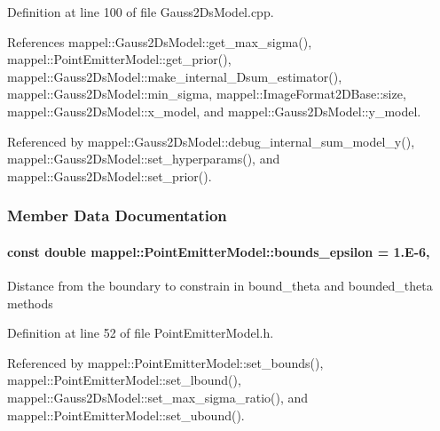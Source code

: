 Definition at line 100 of file Gauss2\+Ds\+Model.\+cpp.



References mappel\+::\+Gauss2\+Ds\+Model\+::get\+\_\+max\+\_\+sigma(), mappel\+::\+Point\+Emitter\+Model\+::get\+\_\+prior(), mappel\+::\+Gauss2\+Ds\+Model\+::make\+\_\+internal\+\_\+Dsum\+\_\+estimator(), mappel\+::\+Gauss2\+Ds\+Model\+::min\+\_\+sigma, mappel\+::\+Image\+Format2\+D\+Base\+::size, mappel\+::\+Gauss2\+Ds\+Model\+::x\+\_\+model, and mappel\+::\+Gauss2\+Ds\+Model\+::y\+\_\+model.



Referenced by mappel\+::\+Gauss2\+Ds\+Model\+::debug\+\_\+internal\+\_\+sum\+\_\+model\+\_\+y(), mappel\+::\+Gauss2\+Ds\+Model\+::set\+\_\+hyperparams(), and mappel\+::\+Gauss2\+Ds\+Model\+::set\+\_\+prior().



\subsubsection{Member Data Documentation}
\paragraph[{\texorpdfstring{bounds\+\_\+epsilon}{bounds_epsilon}}]{\setlength{\rightskip}{0pt plus 5cm}const double mappel\+::\+Point\+Emitter\+Model\+::bounds\+\_\+epsilon = 1.\+E-\/6\hspace{0.3cm}{\ttfamily [static]}, {\ttfamily [inherited]}}\hypertarget{classmappel_1_1PointEmitterModel_ac987a119137b85a27704b1c40e3fab8c}{}\label{classmappel_1_1PointEmitterModel_ac987a119137b85a27704b1c40e3fab8c}
Distance from the boundary to constrain in bound\+\_\+theta and bounded\+\_\+theta methods 

Definition at line 52 of file Point\+Emitter\+Model.\+h.



Referenced by mappel\+::\+Point\+Emitter\+Model\+::set\+\_\+bounds(), mappel\+::\+Point\+Emitter\+Model\+::set\+\_\+lbound(), mappel\+::\+Gauss2\+Ds\+Model\+::set\+\_\+max\+\_\+sigma\+\_\+ratio(), and mappel\+::\+Point\+Emitter\+Model\+::set\+\_\+ubound().

